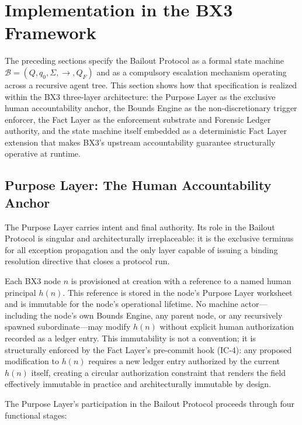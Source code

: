\section{Implementation in the BX3 Framework}\label{sec:bailout-implementation}

The preceding sections specify the Bailout Protocol as a formal state machine
$\mathcal{B} = (Q, q_0, \Sigma, \rightarrow, Q_F)$ and as a compulsory escalation
mechanism operating across a recursive agent tree.  This section shows how that
specification is realized within the BX3 three-layer architecture: the Purpose
Layer as the exclusive human accountability anchor, the Bounds Engine as the
non-discretionary trigger enforcer, the Fact Layer as the enforcement substrate
and Forensic Ledger authority, and the state machine itself embedded as a
deterministic Fact Layer extension that makes BX3's upstream accountability
guarantee structurally operative at runtime.

\subsection{Purpose Layer: The Human Accountability Anchor}
\label{sec:bailout-purpose-layer}

The Purpose Layer carries intent and final authority.  Its role in the Bailout
Protocol is singular and architecturally irreplaceable: it is the exclusive
terminus for all exception propagation and the only layer capable of issuing a
binding resolution directive that closes a protocol run.

Each BX3 node $n$ is provisioned at creation with a reference to a named human
principal $h(n)$.  This reference is stored in the node's Purpose Layer worksheet
and is immutable for the node's operational lifetime.  No machine actor---including
the node's own Bounds Engine, any parent node, or any recursively spawned
subordinate---may modify $h(n)$ without explicit human authorization recorded as
a ledger entry.  This immutability is not a convention; it is structurally
enforced by the Fact Layer's pre-commit hook (IC-4): any proposed modification
to $h(n)$ requires a new ledger entry authorized by the current $h(n)$ itself,
creating a circular authorization constraint that renders the field effectively
immutable in practice and architecturally immutable by design.

The Purpose Layer's participation in the Bailout Protocol proceeds through four
functional stages:

